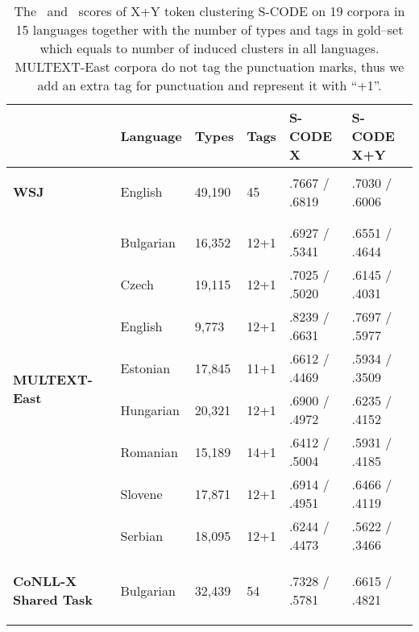 \begin{table}[ht]
  \small
  \caption{The \mto\ and \vm\ scores of X+Y token clustering S-CODE on
    19 corpora in 15 languages together with the number of types and
    tags in gold--set which equals to number of induced clusters in
    all languages.  MULTEXT-East corpora do not tag the punctuation
    marks, thus we add an extra tag for punctuation and represent it
    with ``+1''.}
  \begin{flushleft}
  \begin{tabular}{|@{ }l@{ }|@{ }l@{ }|@{ }l@{ }|@{ }l@{ }|@{ }l@{ }|@{ }l@{ }|}
        \hline
        & Language   & Types    & Tags & S-CODE X & S-CODE X+Y \\ \hline %
        \multirow{1}{*}{\begin{sideways}\textbf{WSJ}\end{sideways}} 
        & English    & 49,190  & 45 & .7667 / .6819 &.7030 / .6006\\
        & & & & &\\ \hline
        \multirow{8}{*}{\begin{sideways}\textbf{MULTEXT-East}\end{sideways}}
        & Bulgarian  & 16,352  & 12+1 & .6927 / .5341 & .6551 / .4644\\
        & Czech      & 19,115  & 12+1 & .7025 / .5020 & .6145 / .4031\\
        & English    & 9,773   & 12+1 & .8239 / .6631 & .7697 / .5977\\
        & Estonian   & 17,845  & 11+1 & .6612 / .4469 & .5934 / .3509\\
        & Hungarian  & 20,321  & 12+1 & .6900 / .4972 & .6235 / .4152\\
        & Romanian   & 15,189  & 14+1 & .6412 / .5004 & .5931 / .4185\\
        & Slovene    & 17,871  & 12+1 & .6914 / .4951 & .6466 / .4119\\
        & Serbian    & 18,095  & 12+1 & .6244 / .4473 & .5622 / .3466\\
        \hline %
        \multirow{10}{*}{\begin{sideways}\textbf{CoNLL-X Shared Task}\end{sideways}}
        & Bulgarian  & 32,439  & 54 & .7328 / .5781 & .6615 / .4821\\

\end{tabular}
\end{flushleft}
\end{table}
